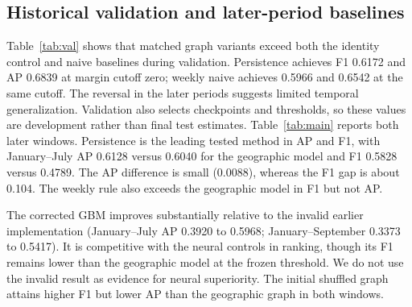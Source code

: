 \documentclass[conference]{IEEEtran}
\begin{document}
\subsection{Historical validation and later-period baselines}
Table~\ref{tab:val} shows that matched graph variants exceed both the identity control and naive baselines during validation. Persistence achieves F1 0.6172 and AP 0.6839 at margin cutoff zero; weekly naive achieves 0.5966 and 0.6542 at the same cutoff. The reversal in the later periods suggests limited temporal generalization. Validation also selects checkpoints and thresholds, so these values are development rather than final test estimates. Table~\ref{tab:main} reports both later windows. Persistence is the leading tested method in AP and F1, with January--July AP 0.6128 versus 0.6040 for the geographic model and F1 0.5828 versus 0.4789. The AP difference is small (0.0088), whereas the F1 gap is about 0.104. The weekly rule also exceeds the geographic model in F1 but not AP.

The corrected GBM improves substantially relative to the invalid earlier implementation (January--July AP 0.3920 to 0.5968; January--September 0.3373 to 0.5417). It is competitive with the neural controls in ranking, though its F1 remains lower than the geographic model at the frozen threshold. We do not use the invalid result as evidence for neural superiority. The initial shuffled graph attains higher F1 but lower AP than the geographic graph in both windows.
\end{document}
